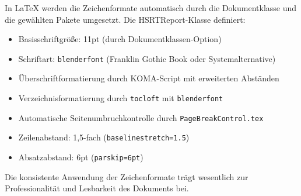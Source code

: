 In \LaTeX{} werden die Zeichenformate automatisch durch die Dokumentklasse und die gewählten Pakete umgesetzt. Die HSRTReport-Klasse definiert:
\begin{itemize}
	\item Basisschriftgröße: 11pt (durch Dokumentklassen-Option)
	\item Schriftart: \texttt{blenderfont} (Franklin Gothic Book oder Systemalternative)
	\item Überschriftformatierung durch KOMA-Script mit erweiterten Abständen
	\item Verzeichnisformatierung durch \texttt{tocloft} mit \texttt{blenderfont}
	\item Automatische Seitenumbruchkontrolle durch \texttt{PageBreakControl.tex}
	\item Zeilenabstand: 1,5-fach (\texttt{baselinestretch=1.5})
	\item Absatzabstand: 6pt (\texttt{parskip=6pt})
\end{itemize}

Die konsistente Anwendung der Zeichenformate trägt wesentlich zur Professionalität und Lesbarkeit des Dokuments bei.

